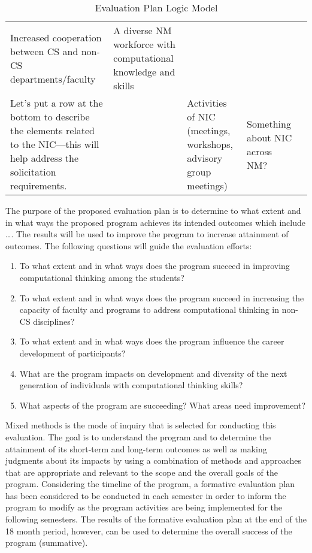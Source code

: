 \begin{table}[hp!]
\begin{tabular}{|p{1in}|p{1in}|p{1in}|p{1in}|p{1in}|}
    \vspace{0.25in}
    Increased cooperation between CS and non-CS departments/faculty

    & 
    A diverse NM workforce with computational knowledge and skills \\
    
    Let’s put a row at the bottom to describe the elements related to the NIC—this will help address the solicitation requirements.
    &
    &
    Activities of NIC (meetings, workshops, advisory group meetings)
    &
    Something about NIC across NM?
    &
    \\
\hline
\end{tabular}
\caption{Evaluation Plan Logic Model}
\label{tab:logic-model}
\end{table}

The purpose of the proposed evaluation plan is to determine to what extent and in what ways the proposed program achieves its intended outcomes which include …. The results will be used to improve the program to increase attainment of outcomes. The following questions will guide the evaluation efforts: 
\begin{enumerate}
\item To what extent and in what ways does the program succeed in improving computational thinking among the students? 
\item To what extent and in what ways does the program succeed in increasing the capacity of faculty and programs to address computational thinking in non-CS disciplines? 
\item To what extent and in what ways does the program influence the career development of participants?
\item What are the program impacts on development and diversity of the next generation of individuals with computational thinking skills?
\item What aspects of the program are succeeding? What areas need improvement? 
\end{enumerate}

Mixed methods is the mode of inquiry that is selected for conducting this evaluation. The goal is to understand the program and to determine the attainment of its short-term and long-term outcomes as well as making judgments about its impacts by using a combination of methods and approaches that are appropriate and relevant to the scope and the overall goals of the program.    
Considering the timeline of the program, a formative evaluation plan has been considered to be conducted in each semester in order to inform the program to modify as the program activities are being implemented for the following semesters. The results of the formative evaluation plan at the end of the 18 month period, however, can be used to determine the overall success of the program (summative). 


